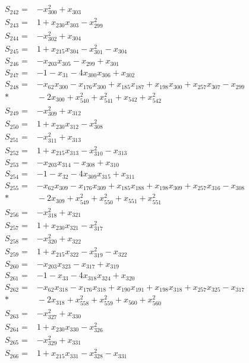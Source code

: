 \begin{align*}
S_{242}={}&-x_{300}^{2}+x_{303}\\[3pt]
S_{243}={}&1+x_{230}x_{303}-x_{299}^{2}\\[3pt]
S_{244}={}&-x_{302}^{2}+x_{304}\\[3pt]
S_{245}={}&1+x_{215}x_{304}-x_{301}^{2}-x_{304}\\[3pt]
S_{246}={}&-x_{203}x_{305}-x_{299}+x_{301}\\[3pt]
S_{247}={}&-1-x_{31}-4x_{300}x_{306}+x_{302}\\[3pt]
S_{248}={}&-x_{62}x_{300}-x_{176}x_{300}+x_{185}x_{187}+x_{198}x_{300}+x_{257}x_{307}-x_{299}\\*
&{}-2x_{300}+x_{540}^{2}+x_{541}^{2}+x_{542}+x_{542}^{2}\\[3pt]
S_{249}={}&-x_{309}^{2}+x_{312}\\[3pt]
S_{250}={}&1+x_{230}x_{312}-x_{308}^{2}\\[3pt]
S_{251}={}&-x_{311}^{2}+x_{313}\\[3pt]
S_{252}={}&1+x_{215}x_{313}-x_{310}^{2}-x_{313}\\[3pt]
S_{253}={}&-x_{203}x_{314}-x_{308}+x_{310}\\[3pt]
S_{254}={}&-1-x_{32}-4x_{309}x_{315}+x_{311}\\[3pt]
S_{255}={}&-x_{62}x_{309}-x_{176}x_{309}+x_{185}x_{188}+x_{198}x_{309}+x_{257}x_{316}-x_{308}\\*
&{}-2x_{309}+x_{549}^{2}+x_{550}^{2}+x_{551}+x_{551}^{2}\\[3pt]
S_{256}={}&-x_{318}^{2}+x_{321}\\[3pt]
S_{257}={}&1+x_{230}x_{321}-x_{317}^{2}\\[3pt]
S_{258}={}&-x_{320}^{2}+x_{322}\\[3pt]
S_{259}={}&1+x_{215}x_{322}-x_{319}^{2}-x_{322}\\[3pt]
S_{260}={}&-x_{203}x_{323}-x_{317}+x_{319}\\[3pt]
S_{261}={}&-1-x_{33}-4x_{318}x_{324}+x_{320}\\[3pt]
S_{262}={}&-x_{62}x_{318}-x_{176}x_{318}+x_{190}x_{191}+x_{198}x_{318}+x_{257}x_{325}-x_{317}\\*
&{}-2x_{318}+x_{558}^{2}+x_{559}^{2}+x_{560}+x_{560}^{2}\\[3pt]
S_{263}={}&-x_{327}^{2}+x_{330}\\[3pt]
S_{264}={}&1+x_{230}x_{330}-x_{326}^{2}\\[3pt]
S_{265}={}&-x_{329}^{2}+x_{331}\\[3pt]
S_{266}={}&1+x_{215}x_{331}-x_{328}^{2}-x_{331}\\[3pt]

\end{align*}
